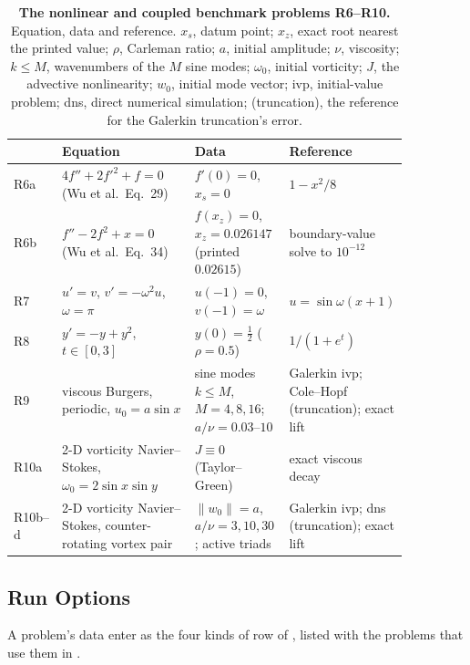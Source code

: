 \begin{table}[htbp]
    \centering
    \caption[The nonlinear and coupled benchmark problems R6--R10]{\textbf{The nonlinear and coupled benchmark problems R6--R10.} Equation, data and reference. $x_s$, datum point; $x_z$, exact root nearest the printed value; $\rho$, Carleman ratio; $a$, initial amplitude; $\nu$, viscosity; $k\le M$, wavenumbers of the $M$ sine modes; $\omega_0$, initial vorticity; $J$, the advective nonlinearity; $w_0$, initial mode vector; \gls{ivp}, initial-value problem; \gls{dns}, direct numerical simulation; (truncation), the reference for the Galerkin truncation's error.}
    \label{tab:catalogue-nonlinear}
    \small
    \begin{tabular}{@{}l p{0.34\linewidth} p{0.24\linewidth} p{0.28\linewidth}@{}}
        \toprule
        & Equation & Data & Reference \\
        \midrule
        R6a & $4f'' + 2f'^2 + f = 0$ (Wu et al.\ Eq.~29) & $f'(0) = 0$, $x_s = 0$ & $1 - x^2/8$ \\
        R6b & $f'' - 2f^2 + x = 0$ (Wu et al.\ Eq.~34) & $f(x_z) = 0$, $x_z = 0.026147$ (printed $0.02615$) & boundary-value solve to $10^{-12}$ \\
        R7  & $u' = v$, $v' = -\omega^2 u$, $\omega = \pi$ & $u(-1) = 0$, $v(-1) = \omega$ & $u = \sin\omega(x+1)$ \\
        R8  & $y' = -y + y^2$, $t \in [0, 3]$ & $y(0) = \tfrac12$ ($\rho = 0.5$) & $1/(1 + e^{t})$ \\
        R9  & viscous Burgers, periodic, $u_0 = a\sin x$ & sine modes $k \le M$, $M = 4, 8, 16$; $a/\nu = 0.03$--$10$ & Galerkin \gls{ivp}; Cole--Hopf (truncation); exact lift \\
        R10a & 2-D vorticity Navier--Stokes, $\omega_0 = 2\sin x\sin y$ & $J \equiv 0$ (Taylor--Green) & exact viscous decay \\
        R10b--d & 2-D vorticity Navier--Stokes, counter-rotating vortex pair & $\|w_0\| = a$, $a/\nu = 3, 10, 30$; active triads & Galerkin \gls{ivp}; \gls{dns} (truncation); exact lift \\
        \bottomrule
    \end{tabular}
\end{table}

\subsection{Run Options}
\label{app:run-options}

A problem's data enter as the four kinds of row of , listed with the problems that use them in .

